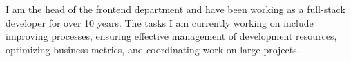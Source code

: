 

\begin{cvparagraph}
I am the head of the frontend department and have been working as a full-stack developer for over 10 years. The tasks I am currently working on include improving processes, ensuring effective management of development resources, optimizing business metrics, and coordinating work on large projects.
\end{cvparagraph}